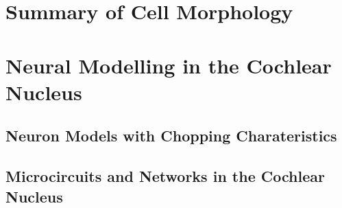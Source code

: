 \documentclass[10pt,a4paper,twoside,openright]{book}
\begin{document}
\section{Summary of Cell Morphology}

\begin{landscape}
{\small{}}
\end{landscape}



\section{Neural Modelling in the Cochlear Nucleus}

\subsection{Neuron Models with Chopping Charateristics}

\subsection{Microcircuits and Networks in the Cochlear Nucleus}

\begin{landscape}
{\small{}}
\end{landscape}

\newpage
\listoftodos
\end{document}
